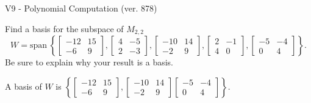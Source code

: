\begin{exercise}
  \begin{exerciseTitle}V9 - Polynomial Computation (ver. 878)\end{exerciseTitle}
  \begin{exerciseStatement}
    Find a basis for the subspace of \(M_{2,2}\) 
\[W=\mathrm{span}\ \left\{\left[\begin{array}{cc}
-12 & 15 \\
-6 & 9
\end{array}\right] , \left[\begin{array}{cc}
4 & -5 \\
2 & -3
\end{array}\right] , \left[\begin{array}{cc}
-10 & 14 \\
-2 & 9
\end{array}\right] , \left[\begin{array}{cc}
2 & -1 \\
4 & 0
\end{array}\right] , \left[\begin{array}{cc}
-5 & -4 \\
0 & 4
\end{array}\right]\right\}.\]
 Be sure to explain why your result is a basis.


  \end{exerciseStatement}
  \begin{exerciseAnswer}
   A basis of \(W\) is  \(\left\{\left[\begin{array}{cc}
-12 & 15 \\
-6 & 9
\end{array}\right] , \left[\begin{array}{cc}
-10 & 14 \\
-2 & 9
\end{array}\right] \left[\begin{array}{cc}
-5 & -4 \\
0 & 4
\end{array}\right]\right\}\).
  


  \end{exerciseAnswer}
\end{exercise}